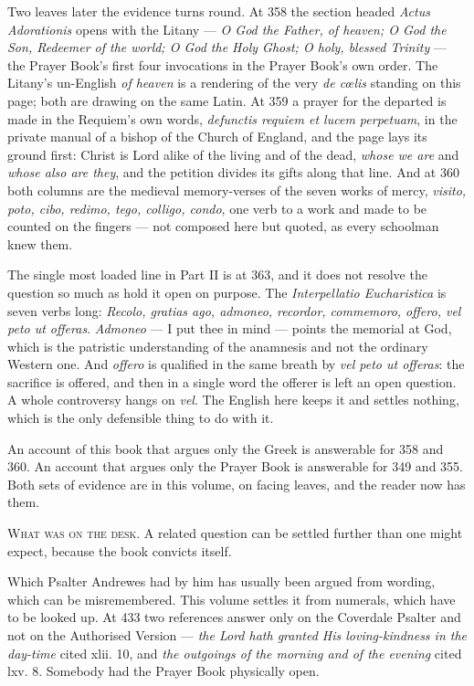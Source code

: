 Two leaves later the evidence turns round. At 358 the section headed \emph{Actus
Adorationis} opens with the Litany --- \emph{O God the Father, of heaven; O God the
Son, Redeemer of the world; O God the Holy Ghost; O holy, blessed Trinity} --- the
Prayer Book's first four invocations in the Prayer Book's own order. The Litany's
un-English \emph{of heaven} is a rendering of the very \emph{de cœlis} standing on
this page; both are drawing on the same Latin. At 359 a prayer for the departed is
made in the Requiem's own words, \emph{defunctis requiem et lucem perpetuam}, in
the private manual of a bishop of the Church of England, and the page lays its
ground first: Christ is Lord alike of the living and of the dead, \emph{whose we
are} and \emph{whose also are they}, and the petition divides its gifts along that
line. And at 360 both columns are the medieval memory-verses of the seven works of
mercy, \emph{visito, poto, cibo, redimo, tego, colligo, condo}, one verb to a work
and made to be counted on the fingers --- not composed here but quoted, as every
schoolman knew them.

The single most loaded line in Part II is at 363, and it does not resolve the
question so much as hold it open on purpose. The \emph{Interpellatio Eucharistica}
is seven verbs long: \emph{Recolo, gratias ago, admoneo, recordor, commemoro,
offero, vel peto ut offeras}. \emph{Admoneo} --- I put thee in mind --- points the
memorial at God, which is the patristic understanding of the anamnesis and not the
ordinary Western one. And \emph{offero} is qualified in the same breath by \emph{vel
peto ut offeras}: the sacrifice is offered, and then in a single word the offerer
is left an open question. A whole controversy hangs on \emph{vel}. The English here
keeps it and settles nothing, which is the only defensible thing to do with it.

An account of this book that argues only the Greek is answerable for 358 and 360.
An account that argues only the Prayer Book is answerable for 349 and 355. Both
sets of evidence are in this volume, on facing leaves, and the reader now has them.

\vspace{0.8\baselineskip}
{\scshape What was on the desk.}\quad
A related question can be settled further than one might expect, because the book
convicts itself.

Which Psalter Andrewes had by him has usually been argued from wording, which can
be misremembered. This volume settles it from numerals, which have to be looked up.
At 433 two references answer only on the Coverdale Psalter and not on the
Authorised Version --- \emph{the Lord hath granted His loving-kindness in the
day-time} cited xlii. 10, and \emph{the outgoings of the morning and of the
evening} cited lxv. 8. Somebody had the Prayer Book physically open.

